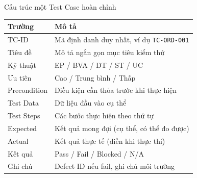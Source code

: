 \documentclass[aspectratio=169,12pt]{beamer}
\begin{document}
\begin{frame}{Cấu trúc một Test Case hoàn chỉnh}
  \begin{center}
  \small
  \begin{tabular}{p{2.5cm}p{8cm}}
    \toprule
    \textbf{Trường} & \textbf{Mô tả} \\
    \midrule
    TC-ID        & Mã định danh duy nhất, ví dụ \texttt{TC-ORD-001} \\
    Tiêu đề      & Mô tả ngắn gọn mục tiêu kiểm thử \\
    Kỹ thuật     & EP / BVA / DT / ST / UC \\
    Ưu tiên      & Cao / Trung bình / Thấp \\
    Precondition & Điều kiện cần thỏa trước khi thực hiện \\
    Test Data    & Dữ liệu đầu vào cụ thể \\
    Test Steps   & Các bước thực hiện theo thứ tự \\
    Expected     & Kết quả mong đợi (cụ thể, có thể đo được) \\
    Actual       & Kết quả thực tế (điền khi thực thi) \\
    Kết quả      & Pass / Fail / Blocked / N/A \\
    Ghi chú      & Defect ID nếu fail, ghi chú môi trường \\
    \bottomrule
  \end{tabular}
  \end{center}
\end{frame}
\end{document}
